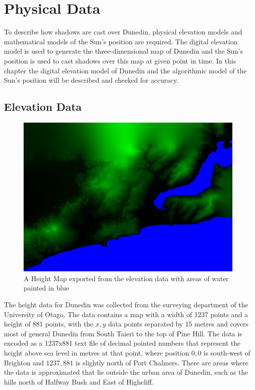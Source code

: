\documentclass[12pt]{report}
\begin{document}
\chapter{Physical Data}
To describe how shadows are cast over Dunedin, physical elevation models and mathematical models of the Sun's position are required. The digital elevation model is used to generate the three-dimensional map of Dunedin and the Sun's position is used to cast shadows over this map at given point in time. In this chapter the digital elevation model of Dunedin and the algorithmic model of the Sun's position will be described and checked for accuracy.

\section{Elevation Data}

\begin{figure}[h]
\includegraphics[width=\textwidth]{heightmapandwater.png}
\caption{A Height Map exported from the elevation data with areas of water painted in blue}
\label{image:elevation-water}
\end{figure}
The height data for Dunedin was collected from the surveying department of the University of Otago. The data contains a map with a width of 1237 points and a height of 881 points, with the $x,y$ data points separated by 15 metres and covers most of general Dunedin from South Taieri to the top of Pine Hill. The data is encoded as a 1237x881 text file of decimal pointed numbers that represent the height above sea level in metres at that point, where position $0,0$ is south-west of Brighton and $1237,881$ is slightly north of Port Chalmers. There are areas where the data is approximated that lie outside the urban area of Dunedin, such as the hills north of Halfway Bush and East of Highcliff.
\end{document}
